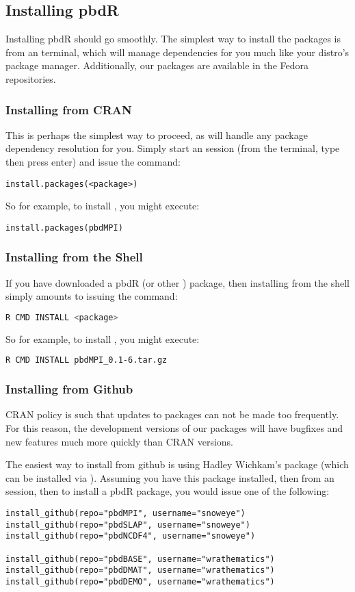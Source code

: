 \subsection{Installing pbdR}
Installing pbdR should go smoothly.  The simplest way to install the packages is from an  terminal, which will manage dependencies for you much like your distro's package manager.  Additionally, our packages are available in the Fedora repositories.


\subsubsection{Installing from CRAN}
This is perhaps the simplest way to proceed, as  will handle any package dependency resolution for you.  Simply start an  session (from the terminal, type  then press enter) and issue the command:
\begin{lstlisting}[language=rr]
install.packages(<package>)
\end{lstlisting}
So for example, to install , you might execute:
\begin{lstlisting}[language=rr]
install.packages(pbdMPI)
\end{lstlisting}


\subsubsection{Installing from the Shell}
If you have downloaded a pbdR (or other ) package, then installing from the shell simply amounts to issuing the command:
\begin{lstlisting}[language=sh]
R CMD INSTALL <package>
\end{lstlisting}
So for example, to install , you might execute:
\begin{lstlisting}[language=sh]
R CMD INSTALL pbdMPI_0.1-6.tar.gz
\end{lstlisting}


\subsubsection{Installing from Github}
CRAN policy is such that updates to packages can not be made too frequently.  For this reason, the development versions of our packages will have bugfixes and new features much more quickly than CRAN versions.  

The easiest way to install from github is using Hadley Wichkam's  package (which can be installed via ).  Assuming you have this package installed, then from an  session, then to install a pbdR package, you would issue one of the following:

\begin{lstlisting}[language=rr]
install_github(repo="pbdMPI", username="snoweye")
install_github(repo="pbdSLAP", username="snoweye")
install_github(repo="pbdNCDF4", username="snoweye")

install_github(repo="pbdBASE", username="wrathematics")
install_github(repo="pbdDMAT", username="wrathematics")
install_github(repo="pbdDEMO", username="wrathematics")
\end{lstlisting}
